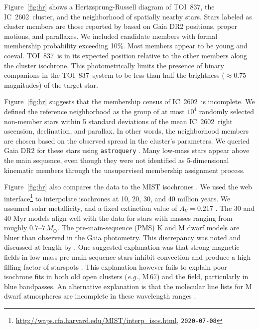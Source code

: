 \documentclass[12pt,twocolumn,tighten]{aastex63}
\newcommand{\tn}{TOI~837} %
\newcommand{\cn}{IC~2602} %
\begin{document}
Figure~\ref{fig:hr} shows a Hertzsprung-Russell diagram of \tn, the
\cn\ cluster, and the neighborhood of spatially nearby stars.
Stars labeled as cluster members are those reported by
\citet{cantatgaudin_gaia_2018} based on Gaia DR2 positions, proper
motions, and parallaxes.  We included candidate members with formal
membership probability exceeding 10\%.  Most members appear to be
young and coeval.  \tn\ is in its expected position relative to the
other members along the cluster isochrone.  This photometrically
limits the presence of binary companions in the \tn\ system to be less
than half the brightness ($\approx0.75$ magnitudes) of the target
star.

Figure~\ref{fig:hr} suggests that the membership census of \cn\ is
incomplete.  We defined the reference neighborhood as the group of at
most $10^4$ randomly selected non-member stars within 5 standard
deviations of the mean \cn\ right ascension, declination, and
parallax.  In other words, the neighborhood members are chosen based
on the observed spread in the cluster's parameters.  We queried Gaia
DR2 for these stars using \texttt{astroquery} \citep{astroquery_2018}.
Many low-mass stars appear above the main sequence, even though they
were not identified as 5-dimensional kinematic members through the
unsupervised \citet{cantatgaudin_gaia_2018} membership assignment
process.

Figure~\ref{fig:hr} also compares the data to the MIST isochrones
\citep{choi_mesa_2016}.  We used the web
interface\footnote{\url{http://waps.cfa.harvard.edu/MIST/interp_isos.html},
\texttt{2020-07-08}} to interpolate isochrones at 10, 20, 30, and 40
million years. We assumed solar metallicity, and a fixed extinction
value of $A_V = 0.217$ \citep{randich_gaiaeso_2018}.  The 30 and 40
Myr models align well with the data for stars with masses ranging from
roughly $0.7$--$7\,M_\odot$.  The pre-main-sequence (PMS) K and M
dwarf models are bluer than observed in the Gaia photometry.  This
discrepancy was noted and discussed at length by
\citet{choi_mesa_2016}.  One suggested explanation was that strong
magnetic fields in low-mass pre-main-sequence stars inhibit convection
and produce a high filling factor of starspots \citep[{\it
e.g.},][]{stauffer_why_2003,feiden_magnetic_2013}.  This explanation
however fails to explain poor isochrone fits in both old open clusters
({\it e.g.}, M$\,$67) and the field, particularly in blue bandpasses.
An alternative explanation is that the molecular line lists for M
dwarf atmospheres are incomplete in these wavelength ranges
\citep{rajpurohit_effective_2013,mann_spectrothermometry_2013}.
\end{document}
